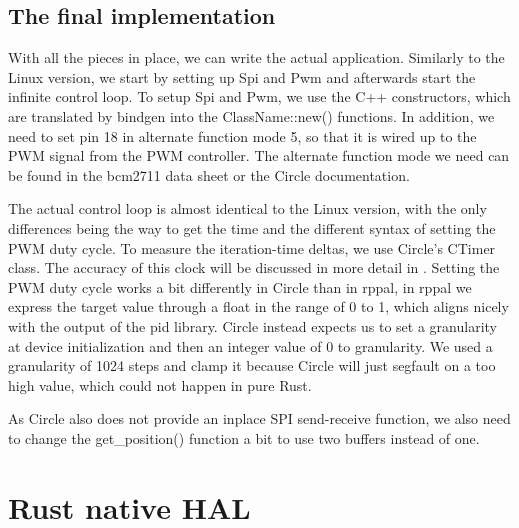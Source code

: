 \subsection{The final implementation}
\label{sec:concept_and_implementation:bare-metal:implementation}

With all the pieces in place, we can write the actual application.
Similarly to the Linux version, we start by setting up Spi and Pwm and afterwards start the infinite control loop.
To setup Spi and Pwm, we use the C++ constructors, which are translated by bindgen into the ClassName::new() functions.
In addition, we need to set pin 18 in alternate function mode 5, so that it is wired up to the PWM signal from the PWM controller.
The alternate function mode we need can be found in the bcm2711 data sheet or the Circle documentation.



The actual control loop is almost identical to the Linux version, with the only differences being the way to get the time and the different syntax of setting the PWM duty cycle.
To measure the iteration-time deltas, we use Circle's CTimer class. The accuracy of this clock will be discussed in more detail in .
Setting the PWM duty cycle works a bit differently in Circle than in rppal,
in rppal we express the target value through a float in the range of 0 to 1,
which aligns nicely with the output of the pid library.
Circle instead expects us to set a granularity at device initialization and then an integer value of 0 to granularity.
We used a granularity of 1024 steps and clamp it because Circle will just segfault on a too high value, which could not happen in pure Rust.



As Circle also does not provide an inplace SPI send-receive function, we also need to change the get\_position() function a bit to use two buffers instead of one.


\section{Rust native HAL}
\label{sec:concept_and_implementation:hal}

